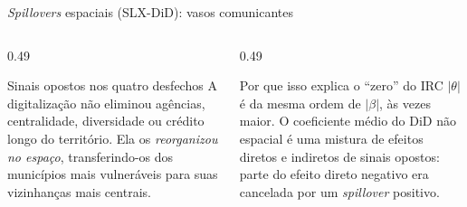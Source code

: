\documentclass[aspectratio=169,10pt]{beamer}
\begin{document}
\begin{frame}{\emph{Spillovers} espaciais (SLX-DiD): vasos comunicantes}
  \vspace{0.6em}
  \begin{columns}[T]
    \begin{column}{0.49\textwidth}
      \begin{alertblock}{Sinais opostos nos quatro desfechos}
        \scriptsize A digitalização não eliminou agências, centralidade,
        diversidade ou crédito longo do território. Ela os \emph{reorganizou no
        espaço}, transferindo-os dos municípios mais vulneráveis para suas
        vizinhanças mais centrais.
      \end{alertblock}
    \end{column}
    \begin{column}{0.49\textwidth}
      \begin{block}{Por que isso explica o ``zero'' do IRC}
        \scriptsize $|\theta|$ é da mesma ordem de $|\beta|$, às vezes maior. O
        coeficiente médio do DiD não espacial é uma mistura de efeitos diretos e
        indiretos de sinais opostos: parte do efeito direto negativo era cancelada
        por um \emph{spillover} positivo.
      \end{block}
    \end{column}
  \end{columns}
\end{frame}
\end{document}
